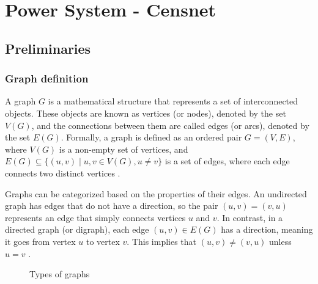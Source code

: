 \chapter{Power System - Censnet} \label{cap:mpcc}

\section{Preliminaries}

\subsection{Graph definition}


A graph $G$ is a mathematical structure that represents a set of interconnected objects. These objects are known as vertices (or nodes), denoted by the set $V(G)$, and the connections between them are called edges (or arcs), denoted by the set $E(G)$. Formally, a graph is defined as an ordered pair $G = (V, E)$, where $V(G)$ is a non-empty set of vertices, and $E(G) \subseteq \{(u, v) \mid u, v \in V(G), u \neq v\}$ is a set of edges, where each edge connects two distinct vertices \cite{Trudeau_2015}.

Graphs can be categorized based on the properties of their edges. An undirected graph has edges that do not have a direction, so the pair $(u, v) = (v, u)$ represents an edge that simply connects vertices $u$ and $v$. In contrast, in a directed graph (or digraph), each edge $(u, v) \in E(G)$ has a direction, meaning it goes from vertex $u$ to vertex $v$. This implies that $(u, v) \neq (v, u)$ unless $u = v$ \cite{Bender_Williamson_2010}.

%
\begin{figure}
    \centering
        \setlength{}        
        \setlength{} 
    \caption{Types of graphs}\label{fig:graph_definition}
\end{figure}

